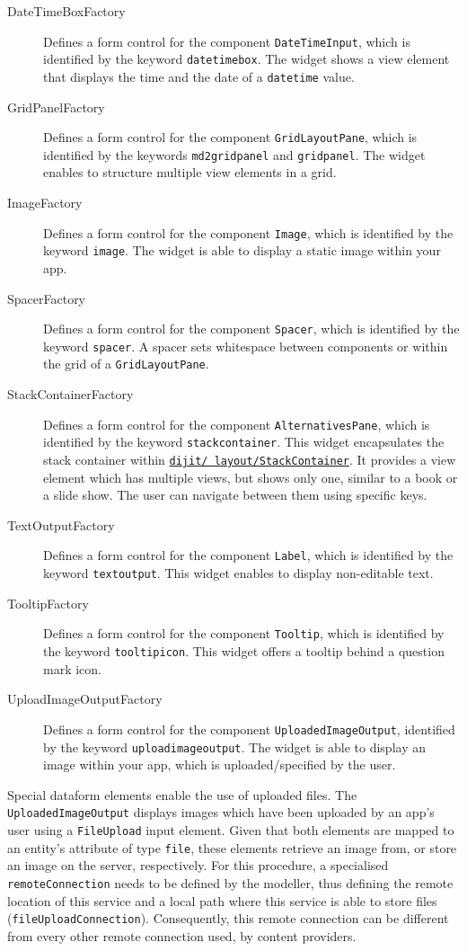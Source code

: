 \begin{description}
	\item[DateTimeBoxFactory] Defines a form control for the component \lstinline|DateTimeInput|, which is identified by the keyword \lstinline|datetimebox|. The widget shows a view element that displays the time and the date of a \lstinline|datetime| value.
	\item[GridPanelFactory] Defines a form control for the component \lstinline|GridLayoutPane|, which is identified by the keywords \lstinline|md2gridpanel| and \lstinline|gridpanel|. The widget enables to structure multiple view elements in a grid.
	\item[ImageFactory] Defines a form control for the component \lstinline|Image|, which is identified by the keyword \lstinline|image|. The widget is able to display a static image within your app.
	\item[SpacerFactory] Defines a form control for the component \lstinline|Spacer|, which is identified by the keyword \lstinline|spacer|. A spacer sets whitespace between components or within the grid of a \lstinline|GridLayoutPane|.
	\item[StackContainerFactory] Defines a form control for the component \lstinline|AlternativesPane|, which is identified by the keyword \lstinline|stackcontainer|. This widget encapsulates the stack container within \href{http://dojotoolkit.org/reference-guide/1.10/dijit/layout/StackContainer.html}{\lstinline|dijit/ layout/StackContainer|}. It provides a view element which has multiple views, but shows only one, similar to a book or a slide show. The user can navigate between them using specific keys. 
	\item[TextOutputFactory] Defines a form control for the component \lstinline|Label|, which is identified by the keyword \lstinline|textoutput|. This widget enables to display non-editable text.
	\item[TooltipFactory] Defines a form control for the component \lstinline|Tooltip|, which is identified by the keyword \lstinline|tooltipicon|. This widget offers a tooltip behind a question mark icon.
	\item[UploadImageOutputFactory] Defines a form control for the component \lstinline|UploadedImageOutput|, identified by the keyword \lstinline|uploadimageoutput|. The widget is able to display an image within your app, which is uploaded/specified by the user. 
\end{description}

Special dataform elements enable the use of uploaded files. The \lstinline|UploadedImageOutput| displays images which have been uploaded by an app's user using a \lstinline|FileUpload| input element. Given that both elements are mapped to an entity's attribute of type \lstinline|file|, these elements retrieve an image from, or store an image on the server, respectively. For this procedure, a specialised \lstinline|remoteConnection| needs to be defined by the modeller, thus defining the remote location of this service and a local path where this service is able to store files (\lstinline|fileUploadConnection|). Consequently, this remote connection can be different from every other remote connection used, \eg by content providers.

